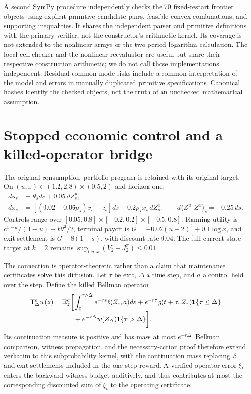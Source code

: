A second SymPy procedure independently checks the 70 fixed-restart frontier objects using explicit primitive candidate pairs, feasible convex combinations, and supporting inequalities. It shares the independent parser and primitive definitions with the primary verifier, not the constructor's arithmetic kernel. Its coverage is not extended to the nonlinear arrays or the two-period logarithm calculation. The local cell checker and the nonlinear reevaluator are useful but share their respective construction arithmetic; we do not call those implementations independent. Residual common-mode risks include a common interpretation of the model and errors in manually duplicated primitive specifications. Canonical hashes identify the checked objects, not the truth of an unchecked mathematical assumption.

\section{Stopped economic control and a killed-operator bridge}\label{sec:stopped}
The original consumption--portfolio program is retained with its original target. On $(u,x)\in(1.2,2.8)\times(0.5,2)$ and horizon one,
\begin{align}
 du_s&=\theta_sds+0.05\,dZ_s^u,\\
 dx_s&=[(0.02+0.06p_s)x_s-c_s]ds+0.2p_sx_s\,dZ_s^x,
 \qquad d\langle Z^u,Z^x\rangle_s=-0.25\,ds.
\end{align}
Controls range over $[0.05,0.8]\times[-0.2,0.2]\times[-0.5,0.8]$. Running utility is $c^{1-u}/(1-u)-k\theta^2/2$, terminal payoff is $G=-0.02(u-2)^2+0.1\log x$, and exit settlement is $G-8(1-s)$, with discount rate $0.04$. The full current-state target at $k=2$ remains $\sup_{t,u,x}(V_2-J_2^\pi)\leq0.01$.

The connection is operator-theoretic rather than a claim that maintenance certificates solve this diffusion. Let $\tau$ be exit, $\Delta$ a time step, and $a$ a control held over the step. Define the killed Bellman operator
\begin{align}\label{eq:killed}
 \mathsf T_\Delta^a w(z)=\mathbb E_z^a\bigg[
 &\int_0^{\tau\wedge\Delta}e^{-rs}\ell(Z_s,a)ds
 +e^{-r\tau}g(t+\tau,Z_\tau)\mathbf 1\{\tau\leq\Delta\}\\[-1mm]
 &+e^{-r\Delta}w(Z_\Delta)\mathbf 1\{\tau>\Delta\}\bigg].\nonumber
\end{align}
Its continuation measure is positive and has mass at most $e^{-r\Delta}$. Bellman comparison, witness propagation, and the necessary-action proof therefore extend verbatim to this subprobability kernel, with the continuation mass replacing $\beta$ and exit settlements included in the one-step reward. A verified operator error $\xi_t$ enters the backward witness budget additively, and thus contributes at most the corresponding discounted sum of $\xi_t$ to the operating certificate.

